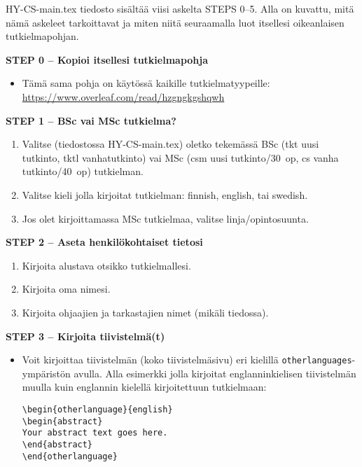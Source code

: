 


HY-CS-main.tex tiedosto sisältää viisi askelta STEPS 0--5. Alla on kuvattu, mitä nämä askeleet tarkoittavat ja miten niitä seuraamalla luot itsellesi oikeanlaisen tutkielmapohjan.
\vspace{0.5cm}

\textbf{STEP 0 -- Kopioi itsellesi tutkielmapohja}

\begin{itemize}
\item Tämä sama pohja on käytössä kaikille tutkielmatyypeille:\\ \url{https://www.overleaf.com/read/hzgngkgshqwh}
\end{itemize}


{\textbf{STEP 1 -- BSc vai MSc tutkielma?}}
\begin{enumerate}
\item Valitse (tiedostossa HY-CS-main.tex) oletko tekemässä BSc (tkt uusi tutkinto, tktl vanhatutkinto) vai MSc (csm uusi tutkinto/30~op, cs vanha tutkinto/40~op)
tutkielman.
\item Valitse kieli jolla kirjoitat tutkielman: finnish, english, tai swedish.
\item Jos olet kirjoittamassa MSc tutkielmaa, valitse linja/opintosuunta.
\end{enumerate}


{\textbf{STEP 2 -- Aseta henkilökohtaiset tietosi}}

\begin{enumerate}
\item Kirjoita alustava otsikko tutkielmallesi.
\item Kirjoita oma nimesi.
\item Kirjoita ohjaajien ja tarkastajien nimet (mikäli tiedossa).
\end{enumerate}

{\textbf{STEP 3 -- Kirjoita tiivistelmä(t)}}

\begin{itemize}
\item Voit kirjoittaa tiivistelmän (koko tiivistelmäsivu) eri kielillä \texttt{otherlanguages}-ympäristön avulla. Alla esimerkki jolla kirjoitat englanninkielisen tiivistelmän muulla kuin englannin kielellä kirjoitettuun tutkielmaan:

\begin{verbatim}
\begin{otherlanguage}{english} 
\begin{abstract}
Your abstract text goes here. 
\end{abstract} 
\end{otherlanguage}
\end{verbatim}

\end{itemize}

